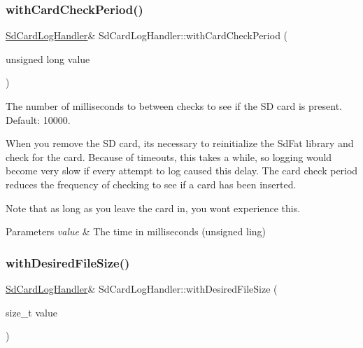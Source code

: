 \subsubsection{\texorpdfstring{with\+Card\+Check\+Period()}{withCardCheckPeriod()}}
{\footnotesize\ttfamily \mbox{\hyperlink{class_sd_card_log_handler}{Sd\+Card\+Log\+Handler}}\& Sd\+Card\+Log\+Handler\+::with\+Card\+Check\+Period (\begin{DoxyParamCaption}\item[{unsigned long}]{value }\end{DoxyParamCaption})\hspace{0.3cm}{\ttfamily [inline]}}



The number of milliseconds to between checks to see if the SD card is present. Default\+: 10000. 

When you remove the SD card, it\textquotesingle{}s necessary to reinitialize the Sd\+Fat library and check for the card. Because of timeouts, this takes a while, so logging would become very slow if every attempt to log caused this delay. The card check period reduces the frequency of checking to see if a card has been inserted.

Note that as long as you leave the card in, you won\textquotesingle{}t experience this.


\begin{DoxyParams}{Parameters}
{\em value} & The time in milliseconds (unsigned ling) \\
\hline
\end{DoxyParams}
\mbox{\label{class_sd_card_log_handler_acc76163e6861837a80f46c0d7aa77176}} 
\subsubsection{\texorpdfstring{with\+Desired\+File\+Size()}{withDesiredFileSize()}}
{\footnotesize\ttfamily \mbox{\hyperlink{class_sd_card_log_handler}{Sd\+Card\+Log\+Handler}}\& Sd\+Card\+Log\+Handler\+::with\+Desired\+File\+Size (\begin{DoxyParamCaption}\item[{size\+\_\+t}]{value }\end{DoxyParamCaption})\hspace{0.3cm}{\ttfamily [inline]}}



